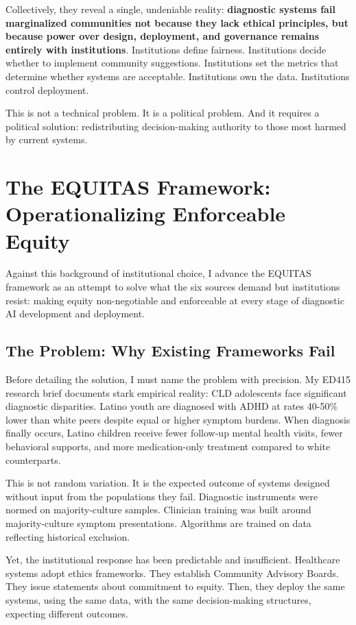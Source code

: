 \documentclass[12pt,a4paper]{article}
\begin{document}
Collectively, they reveal a single, undeniable reality: \textbf{diagnostic systems fail marginalized communities not because they lack ethical principles, but because power over design, deployment, and governance remains entirely with institutions}. Institutions define fairness. Institutions decide whether to implement community suggestions. Institutions set the metrics that determine whether systems are acceptable. Institutions own the data. Institutions control deployment.

This is not a technical problem. It is a political problem. And it requires a political solution: redistributing decision-making authority to those most harmed by current systems.

\section{The EQUITAS Framework: Operationalizing Enforceable Equity}

Against this background of institutional choice, I advance the EQUITAS framework as an attempt to solve what the six sources demand but institutions resist: making equity non-negotiable and enforceable at every stage of diagnostic AI development and deployment.

\subsection{The Problem: Why Existing Frameworks Fail}

Before detailing the solution, I must name the problem with precision. My ED415 research brief documents stark empirical reality: CLD adolescents face significant diagnostic disparities. Latino youth are diagnosed with ADHD at rates 40-50\% lower than white peers despite equal or higher symptom burdens. When diagnosis finally occurs, Latino children receive fewer follow-up mental health visits, fewer behavioral supports, and more medication-only treatment compared to white counterparts.

This is not random variation. It is the expected outcome of systems designed without input from the populations they fail. Diagnostic instruments were normed on majority-culture samples. Clinician training was built around majority-culture symptom presentations. Algorithms are trained on data reflecting historical exclusion.

Yet, the institutional response has been predictable and insufficient. Healthcare systems adopt ethics frameworks. They establish Community Advisory Boards. They issue statements about commitment to equity. Then, they deploy the same systems, using the same data, with the same decision-making structures, expecting different outcomes.
\end{document}
